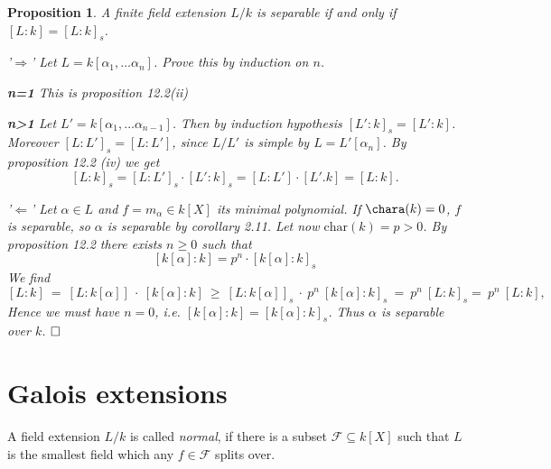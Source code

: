 \documentclass[11pt]{book}
\newtheorem{proposition}[theorem]{Proposition}
\theoremstyle{nonumberbreak}
\newenvironment{defin}[1][]{\ifthenelse{\equal{#1}{}}{\definition}{\definition[#1]}\rm}{\enddefinition}
\newenvironment{pr}[1][]{\ifthenelse{\equal{#1}{}}{\proof}{\proof[#1]}\rm}{\endproof}
\begin{document}
\begin{spacing}{1.3}
\begin{proposition}%
A finite field extension $L/k$ is separable if and only if $[L:k]=[L:k]_s$.
\begin{pr}
\begin{compactitem}
\item['$\Rightarrow$'] Let $L=k[\alpha_1, \dots \alpha_n]$. Prove this by induction on $n$.
\begin{compactitem}
\item[\textbf{n=1}] This is proposition 12.2(ii)
\item[\textbf{n>1}] Let $L'=k[\alpha_1, \dots \alpha_{n-1}]$. Then by induction hypothesis $[L':k]_s=[L':k]$. Moreover $[L:L']_s=[L:L']$, since $L/L'$ is simple by $L=L'[\alpha_n]$. By proposition 12.2 (iv) we get
$$[L:k]_s=[L:L']_s \cdot [L':k]_s=[L:L'] \cdot [L'.k]=[L:k].$$
\end{compactitem}
\item['$\Leftarrow$'] Let $\alpha \in L$ and $f= m_{\alpha} \in k[X]$ its minimal polynomial. If $\chara(k)=0$, $f$ is separable, so $\alpha$ is separable by corollary 2.11. Let now $\textrm{char}(k)=p>0$. 
By proposition 12.2 there exists $n \geqslant 0$ such that $$[k[\alpha]:k]=p^n \cdot [k[\alpha]:k]_s$$We find
$$
[L:k]\ =\ [L:k[\alpha]] \ \cdot\ [k[\alpha]:k] \ \geqslant \ [L:k[\alpha]]_s\ \cdot\ p^n \ [k[\alpha]:k]_s \ = \ p^n\ [L:k]_s = \ p^n  \ [L:k],$$
Hence we must have $n=0$, i.e. $[k[\alpha]:k]=[k[\alpha]:k]_s$. Thus $\alpha$ is separable over $k$. $\hfill \Box$
\end{compactitem}
\end{pr}
\end{proposition}


\renewcommand*\thesection{§ \arabic{section}\quad}
\section{Galois extensions}
\renewcommand*\thesection{\arabic{section}}

\begin{defin} %
A field extension $L/k$ is called \textit{normal}, if there is a subset $\mathcal{F} \subseteq k[X]$ such that $L$ is the smallest field which any $f \in \mathcal{F}$ splits over.
\end{defin}




\end{spacing}
\end{document}
